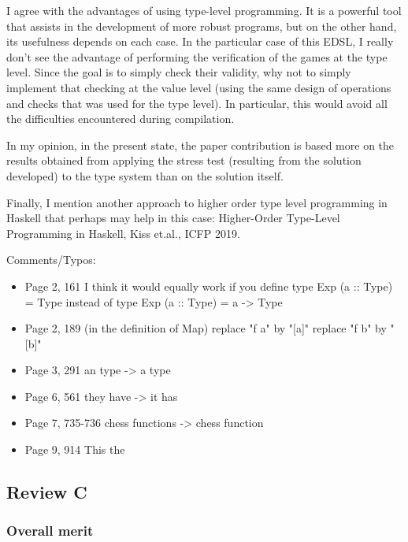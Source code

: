 I agree with the advantages of using type-level programming. It is a powerful tool that assists in the development of more robust programs, but on the other hand, its usefulness depends on each case. In the particular case of this EDSL, I really don't see the advantage of performing the verification of the games at the type level. Since the goal is to simply check their validity, why not to simply implement that checking at the value level (using the same design of operations and checks that was used for the type level). In particular, this would avoid all the difficulties encountered during compilation.

In my opinion, in the present state, the paper contribution is based more on the results obtained from applying the stress test (resulting from the solution developed) to the type system than on the solution itself.

Finally, I mention another approach to higher order type level programming in Haskell that perhaps may help in this case: Higher-Order Type-Level Programming in Haskell, Kiss et.al., ICFP 2019.

Comments/Typos:

\begin{itemize}
      \item Page 2, 161
            I think it would equally work if you define
            type Exp (a :: Type) = Type
            instead of
            type Exp (a :: Type) = a -> Type

      \item Page 2, 189 (in the definition of Map)
            replace "f a" by "[a]"
            replace "f b" by "[b]"

      \item Page 3, 291
            an type -> a type

      \item Page 6, 561
            they have -> it has

      \item Page 7, 735-736
            chess functions -> chess function

      \item Page 9, 914
            This the
\end{itemize}

\subsection*{Review C}

\subsubsection*{Overall merit}

